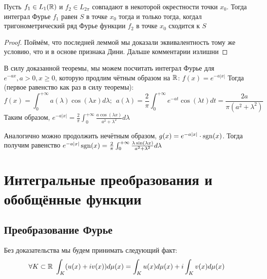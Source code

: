 \begin{theorem}
	Пусть $f_1 \in L_1(\mathbb{R})$ и $f_2 \in L_{2\pi}$ совпадают в некоторой окрестности точки $x_0$. Тогда интеграл Фурье $f_1$ равен $S$ в точке $x_0$ тогда и только тогда, когдал тригонометрический ряд Фурье функции $f_2$ в точке $x_0$ сходится к $S$
\end{theorem}

\begin{proof}
	Поймём, что последней леммой мы доказали эквивалентность тому же условию, что и в основе признака Дини. Дальше комментарии излишни
\end{proof}

\begin{example}
	В силу доказанной теоремы, мы можем посчитать интеграл Фурье для $e^{-ax}, a > 0, x \ge 0$, которую продлим чётным образом на $\mathbb{R}$: $f(x) = e^{-a|x|}$ Тогда (первое равенство как раз в силу теоремы):
	\[
		f(x) = \int_0^{+\infty} a(\lambda)\cos(\lambda x)d\lambda;\ \ a(\lambda) = \frac{2}{\pi} \int_0^{+\infty} e^{-at}\cos(\lambda t)dt = \frac{2a}{\pi(a^2 + \lambda^2)}
	\]
	Таким образом, $e^{-a|x|} = \frac{2}{\pi} \int_0^{+\infty} \frac{a\cos(\lambda x)}{a^2 + \lambda^2}d\lambda$
	
	Аналогично можно продолжить нечётным образом, $g(x) = e^{-a|x|} \cdot \operatorname{sgn}(x)$. Тогда получим равенство $e^{-a|x|} \operatorname{sgn}(x) = \frac{2}{\pi} \int_0^{+\infty} \frac{\lambda \sin(\lambda x)}{a^2 + \lambda^2}d\lambda$
\end{example}

\section{Интегральные преобразования и обобщённые функции}

\subsection{Преобразование Фурье}

\begin{note}
	Без доказательства мы будем принимать следующий факт:
	\[
		\forall K \subset \mathbb{R}\ \int_K (u(x) + iv(x))d\mu(x) = \int_K u(x)d\mu(x) + i\int_K v(x)d\mu(x)
	\]
\end{note}

